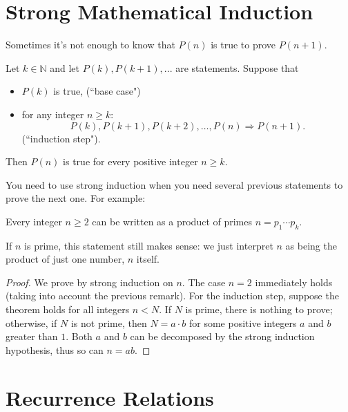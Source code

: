 \documentclass[11pt,dvipsnames]{book}
\numberwithin{equation}{section} %
\numberwithin{figure}{section} %
\numberwithin{table}{section} %
\begin{document}
\section{Strong Mathematical Induction}
Sometimes it's not enough to know that $P(n)$ is true to prove $P(n+1)$. 
\ 
\begin{theorem}
  Let $k\in \mathbb{N}$ and let $P(k),P(k+1),...$ are statements. Suppose that\ 
  \begin{itemize}
  \item $P(k)$ is true,  (``base case")\ 
  \item for any integer
$n\geqslant k$:   $$ P(k),P(k+1),P(k+2),\ldots,P(n)\Longrightarrow
P(n+1).$$ (``induction step"). \ 

\end{itemize} 

  Then $P(n)$ is true for every positive integer $n\geqslant
k$.
\end{theorem}


You need to use strong induction when you need several previous statements to prove the next one. For example:

\begin{theorem}
Every integer $n\geq 2$ can be written as a product of primes $n=p_{1}\cdots p_{k}$. 
\end{theorem}

\begin{remark}
If $n$ is prime, this statement still makes sense: we just interpret $n$ as being the product of just one number, $n$ itself. 
\end{remark}

\begin{proof}
We prove by strong induction on $n$. The case $n=2$ immediately holds (taking into account the previous remark). For the induction step, suppose the theorem holds for all integers $n<N$.  If $N$ is prime, there is nothing to prove; otherwise, if $N$ is not prime, then $N=a\cdot b$ for some positive integers $a$ and $b$ greater than $1$. Both $a$ and $b$ can be  decomposed by the strong induction hypothesis, thus so can $n=ab$.
\end{proof}



\section{Recurrence Relations}
\end{document}
